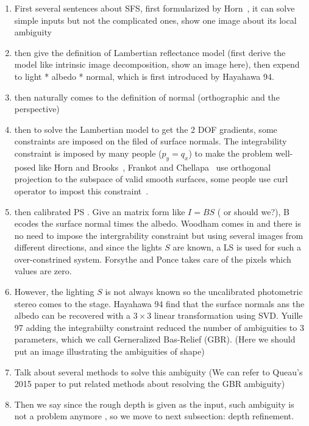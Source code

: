 \begin{enumerate}
\item First several sentences about SFS, first formularized by  Horn~\cite{horn1970shape}, it can solve simple inputs but not the complicated ones, show one image about its local ambiguity

\item then give the definition of Lambertian reflectance model (first derive the model like intrinsic image decomposition, show an image here), then expend to light * albedo * normal, which is first introduced by Hayahawa 94. 

\item then naturally comes to the definition of normal (orthographic and the perspective)

\item then to solve the Lambertian model to get the 2 DOF gradients, some constraints are imposed on the filed of surface normals. The integrability constraint is imposed by many people ($p_y = q_x$) to make the problem well-posed like Horn and Brooks~\cite{horn1986variational},  {\color{red}Frankot and Chellapa~\cite{frankot1988method} use orthogonal projection to the subspace of valid smooth surfaces}, some people use curl operator to impost this constraint~\cite{han2013high}.

\item then calibrated PS . Give an matrix form like $I = BS$ ({\color{red} or should we?}), B ecodes the surface normal times the albedo. Woodham comes in and there is no need to impose the intergrability constraint but using several images from different directions, and since the lights $S$ are known, a LS is used for such a over-constrined system. Forsythe and Ponce takes care of the pixels which values are zero.

\item However, the lighting $S$ is not always known so the uncalibrated photometric stereo comes to the stage. Hayahawa 94 find that the surface normals ans the albedo can be recovered with a $3\times3$ linear transformation using SVD. Yuille 97 adding the integrabiilty constraint reduced the number of ambiguities to 3 parameters, which we call Gerneralized Bas-Relief (GBR). (Here we should put an image illustrating the ambiguities of shape)

\item Talk about several methods to solve this ambiguity (We can refer to Queau's 2015 paper to put related methods about resolving the GBR ambiguity)

\item Then we say since the rough depth is given as the input, such ambiguity is not a problem anymore , so we move to next subsection: depth refinement.

\end{enumerate}


